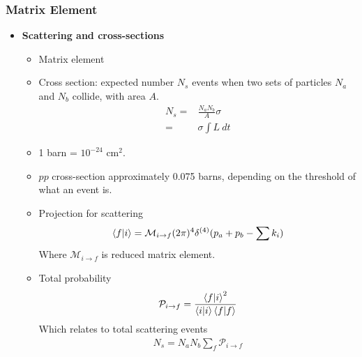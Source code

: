 \subsubsection{Matrix Element}
\begin{itemize}
        \item \textbf{Scattering and cross-sections} \cite{wells}
        \begin{itemize}
            \item Matrix element \cite{wells}
            \item Cross section: expected number $N_s$ events when two sets of particles $N_a$ and $N_b$ collide, with area $A$. \cite{wells}
            \begin{equation}\begin{split}
            N_s=&\frac{N_aN_b}{A}\sigma \\
            =&\sigma\int L~dt
            \end{split}\end{equation}
            \item 1 barn = $10^{-24}$ cm$^2$. \cite{wells}
            \item $pp$ cross-section approximately 0.075 barns, depending on the threshold of what an event is. \cite{wells}
            \item Projection for scattering \cite{wells}
            \begin{equation}\begin{split}
            \braket{f|i}=\mathcal{M}_{i\to f}(2\pi)^4\delta^{(4)}(p_a+p_b-\sum k_i)
            \end{split}\end{equation}
            Where $\mathcal{M}_{i\to f}$ is reduced matrix element.
            \item Total probability \cite{wells}
            \begin{equation}\begin{split}
            \mathcal{P}_{i\to f}=\frac{\braket{f|i}^2}{\braket{i|i}\braket{f|f}}
            \end{split}\end{equation}
            Which relates to total scattering events
            \begin{equation}\begin{split}
            N_s=N_aN_b\sum_f\mathcal{P}_{i\to f}
            \end{split}\end{equation}

\end{itemize}
\end{itemize}
